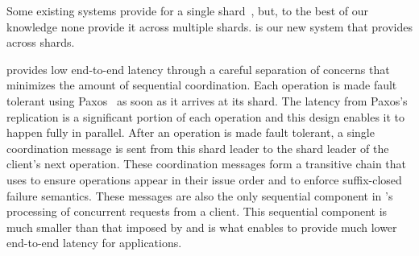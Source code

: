 
Some existing systems provide \mdl{} for a single shard~\cite{ongaro2014consensus}, but,
to the best of our knowledge none provide it across multiple shards.
\sys{} is our new system that provides \mdl{} across shards.


\sys{} provides low end-to-end latency through a careful separation of concerns that minimizes the amount of sequential coordination. %
Each operation is made fault tolerant using Paxos~\cite{lamport1998paxos} as soon as it arrives at its shard.
The latency from Paxos's replication is a significant portion of each operation and this design enables it to happen fully in parallel.
After an operation is made fault tolerant, a single coordination message is sent from this shard leader to the shard leader of the client's next operation.
These coordination messages form a transitive chain that \sys{} uses to ensure operations appear in their issue order and to enforce suffix-closed failure semantics.
These messages are also the only sequential component in \sys{}'s processing of concurrent requests from a client.
This sequential component is much smaller than that imposed by \sdl{} and is what enables \sys{} to provide much lower end-to-end latency for applications.



